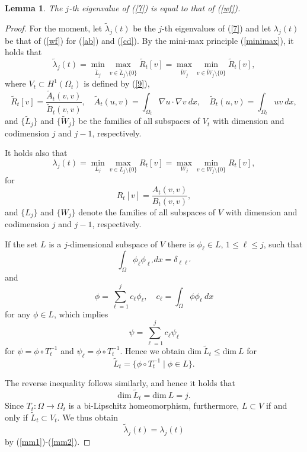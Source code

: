 \documentclass[final,a4paper]{jmsj}
\theoremstyle{thmstyleone}%
\theoremstyle{thmstyletwo}%
\theoremstyle{thmstylethree}%
\newtheorem{lemma}[theorem]{Lemma}
\begin{document}
\begin{lemma}\label{equiv} 
The $j$-th eigenvalue of (\ref{7}) is equal to that of (\ref{wf}). 
\end{lemma} 
\begin{proof} 
For the moment, let $\tilde \lambda_j(t)$ be the $j$-th eigenvalues of (\ref{7}) and let $\lambda_j(t)$ be that of  (\ref{wf}) for (\ref{ab}) and (\ref{cd}). By the mini-max principle (\ref{minimax}), it holds that 
\begin{equation} 
\tilde \lambda_j(t)=\min_{\tilde L_j}\max_{v\in \tilde L_j\setminus \{0\}}\tilde R_t[v]=\max_{\tilde W_j}\min_{v\in \tilde W_j\setminus \{0\}}\tilde R_t[v], 
 \label{mm1} 
\end{equation} 
where $V_t\subset H^1(\Omega_t)$ is defined by (\ref{9}), 
\[ \tilde R_t[v]=\frac{\tilde A_t(v,v)}{\tilde B_t(v,v)}, \quad  
\tilde A_t(u,v)=\int_{\Omega_t}\nabla u\cdot \nabla v \ dx, \quad \tilde B_t(u,v)=\int_{\Omega_t}uv \ dx, \] 
and $\{ \tilde L_j\}$ and $\{ \tilde W_j\}$ be the families of all subspaces of $V_t$ with dimension and codimension $j$ and $j-1$, respectively.

 It holds also that 
\begin{equation} 
\lambda_j(t)=\min_{L_j}\max_{v\in L_j\setminus \{0\}} R_t[v]=\max_{W_j}\min_{v\in W_j\setminus \{0\}} R_t[v], 
 \label{mm2}
\end{equation} 
for  
\begin{equation} 
R_t[v]=\frac{A_t(v,v)}{B_t(v,v)},  
 \label{rt}
\end{equation} 
 and $\{ L_j\}$ and $\{ W_j\}$ denote the families of all subspaces of $V$ with dimension and codimension $j$ and $j-1$, respectively.

If the set $L$ is a $j$-dimensional subspace of $V$ there is $\phi_\ell \in L$, $1\leq \ell \leq j$, such that 
\[ \int_\Omega \phi_\ell \phi_{\ell'}dx=\delta_{\ell \ell'} \] 
and 
\[ \phi=\sum_{\ell=1}^jc_\ell \phi_\ell, \quad c_\ell=\int_\Omega \phi\phi_\ell \ dx  \] 
for any $\phi \in L$, which implies   
\[ \psi=\sum_{\ell=1}^jc_\ell \psi_\ell \] 
for $\psi=\phi\circ T_t^{-1}$ and $\psi_\ell=\phi\circ T_t^{-1}$. Hence we obtain $\mbox{dim} \ \tilde L_t\leq \mbox{dim} \ L$ for  
\[ \tilde L_t=\{ \phi\circ T_t^{-1} \mid \phi \in L\}. \] 

The reverse inequality follows similarly, and hence it holds that  
\[ \mbox{dim} \ \tilde L_t=\mbox{dim} \ L=j. \] 
Since $T_t:\Omega \rightarrow \Omega_t$ is a bi-Lipschitz homeomorphism, furthermore, $L\subset V$ if and only if $\tilde L_t\subset  V_t$. We thus obtain  
\begin{equation} 
\tilde \lambda_j(t)=\lambda_j(t)      
 \label{17}
\end{equation} 
by (\ref{mm1})-(\ref{mm2}).
\end{proof} 
\end{document}
